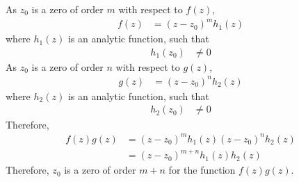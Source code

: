 \documentclass[titlepage, fleqn, a4paper, 12pt, twoside]{article}
\theoremstyle{definition}
\theoremstyle{theorem}
\begin{document}
\begin{solution}
	As $z_0$ is a zero of order $m$ with respect to $f(z)$,
	\begin{align*}
		f(z) & = (z - z_0)^m h_1(z)
	\end{align*}
	where $h_1(z)$ is an analytic function, such that
	\begin{align*}
		h_1(z_0) & \neq 0
	\end{align*}
	As $z_0$ is a zero of order $n$ with respect to $g(z)$,
	\begin{align*}
		g(z) & = (z - z_0)^n h_2(z)
	\end{align*}
	where $h_2(z)$ is an analytic function, such that
	\begin{align*}
		h_2(z_0) & \neq 0
	\end{align*}
	Therefore,
	\begin{align*}
		f(z) g(z) & = (z - z_0)^m h_1(z) (z - z_0)^n h_2(z) \\
                          & = (z - z_0)^{m + n} h_1(z) h_2(z)
	\end{align*}
	Therefore, $z_0$ is a zero of order $m + n$ for the function $f(z) g(z)$.
\end{solution}
\end{document}
